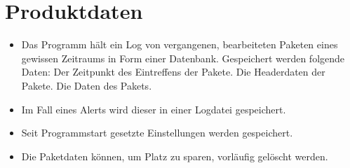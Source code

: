 \chapter{Produktdaten}


\begin{itemize}
  \item Das Programm hält ein Log von vergangenen, bearbeiteten Paketen eines gewissen Zeitraums in Form einer Datenbank. Gespeichert werden folgende Daten:
    \subitem Der Zeitpunkt des Eintreffens der Pakete.
    \subitem Die Headerdaten der Pakete.
    \subitem Die Daten des Pakets.
  \item Im Fall eines Alerts wird dieser in einer Logdatei gespeichert.
  \item Seit Programmstart gesetzte Einstellungen werden gespeichert.
  \item Die Paketdaten können, um Platz zu sparen, vorläufig gelöscht werden.
\end{itemize} 